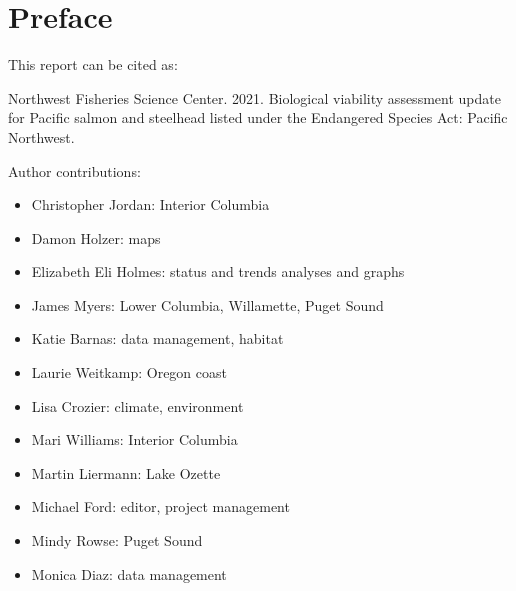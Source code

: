 \documentclass[
  letterpaper,
  oneside,
  open=any]{scrbook}
\providecommand{\tightlist}{%
  \setlength{\itemsep}{0pt}\setlength{\parskip}{0pt}}\usepackage{longtable,booktabs,array}
\renewcommand*\contentsname{Table of contents}
\newcommand\contentsname{Table of contents}
\begin{document}
\begin{frontmatter}
\begin{titlepage}
\begin{minipage}[b][\textheight][s]{\minipagewidth}
\titleblock

\authorblock

\affiliationblock

\vfill

\logoblock

\footerblock
\par

\end{minipage}
\clearpage
\restoregeometry
\end{titlepage}
\setcounter{page}{1}
\end{frontmatter}


\renewcommand*\contentsname{Table of contents}
{
\setcounter{tocdepth}{1}
\tableofcontents
}
\listoffigures
\listoftables
\mainmatter
{}

\hypertarget{preface}{%
\chapter*{Preface}\label{preface}}


This report can be cited as:

Northwest Fisheries Science Center. 2021. Biological viability
assessment update for Pacific salmon and steelhead listed under the
Endangered Species Act: Pacific Northwest.

Author contributions:

\begin{itemize}
\tightlist
\item
  Christopher Jordan: Interior Columbia
\item
  Damon Holzer: maps
\item
  Elizabeth Eli Holmes: status and trends analyses and graphs
\item
  James Myers: Lower Columbia, Willamette, Puget Sound
\item
  Katie Barnas: data management, habitat
\item
  Laurie Weitkamp: Oregon coast
\item
  Lisa Crozier: climate, environment
\item
  Mari Williams: Interior Columbia
\item
  Martin Liermann: Lake Ozette
\item
  Michael Ford: editor, project management
\item
  Mindy Rowse: Puget Sound
\item
  Monica Diaz: data management
\end{itemize}
\end{document}
